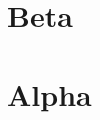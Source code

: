 \documentclass[]{politex}
\begin{document}
%

%


\apendice
\chapter{}
\chapter{Beta}


\anexo
\chapter{Alpha}
\chapter{}
\end{document}
